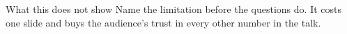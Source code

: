 \begin{frame}{What this does not show}
  Name the limitation before the questions do. It costs one slide and buys the audience's
  trust in every other number in the talk.
\end{frame}
